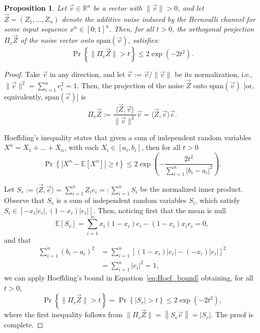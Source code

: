 \documentclass[10pt, conference]{IEEEtran}
\newtheorem{proposition}[theorem]{Proposition}
\newcommand{\1}{\mathds{1}}
\newcommand{\EE}{\mathbb{E}}
\newcommand{\RR}{\mathbb{R}}
\begin{document}
\begin{proposition}\label{proposition:projective_property}
Let $\vec{v}\in\RR^n$ be a vector with $\|\vec v\|>0$, and let $\vec{Z}=(Z_1,\dots,Z_n)$ denote the additive noise induced by the Bernoulli channel for some input sequence $x^n\in[0;1]^n$. Then, for all $t>0$, the orthogonal projection $\Pi_{v}\vec Z$ of the noise vector onto $\text{span}(\vec{v})$, satisfies:
\[
\Pr\left\{\|\Pi_{v}\vec Z\|>t\right\}\leq 2\exp \left(-2t^2\right).
\]
\end{proposition}
\begin{proof}
Take $\vec v$ in any direction, and let $\vec e:=\vec v/\|\vec v\|$ be its normalization, i.e., $\|\vec e\|^2=\sum_{i=1}^n e_i^2=1$. Then, the projection of the noise $\vec Z$ onto $\text{span}(\vec v)$ [or, equivalently, $\text{span}(\vec e)$] is
\begin{equation}\label{eq:orth_projection}
\Pi_{v}\vec Z:=\frac{\langle\vec Z,\vec v\rangle}{\|\vec v\|^2}\vec v=\langle\vec Z,\vec e\rangle\vec e.
\end{equation}

Hoeffding's inequality \cite{Hoeffding_inequality} states that given a sum of independent random variables $X^n=X_1+\dots+X_n$, with each $X_i\in[a_i,b_i]$, then for all $t>0$
\begin{equation}\label{eq:Hoef_bound}
\!\!\Pr\left\{|X^n-\EE[X^n]|\!\geq\! t\right\}\leq 2\exp\left(-\frac{2t^2}{\sum_{i=1}^n \left|b_i-a_i\right|^2}\right)\!.
\end{equation}

Let  
\(
S_v:=\langle\vec Z,\vec e\rangle=\sum_{i=1}^n Z_ie_i=:\sum_{i=1}^n S_i
\)
be the normalized inner product. Observe that $S_v$ is a sum of independent random variables $S_i$, which satisfy $S_i\in[-x_i|e_i|,(1-x_i)|e_i|]$. Then, noticing first that the mean is null
\begin{equation}
    \EE[S_v]=\sum_{i=1}^n x_i(1-x_i)e_i-(1-x_i)x_ie_i=0,
\end{equation}
and that 
\begin{equation}
\begin{split}
\sum_{i=1}^n(b_i-a_i)^2&=\sum_{i=1}^n \left[(1-x_i)|e_i|-(-x_i)|e_i|\right]^2\\
&=\sum_{i=1}^n |e_i|^2=1,
\end{split}
\end{equation}
we can apply Hoeffding's bound in Equation~\eqref{eq:Hoef_bound} obtaining, for all $t>0$,
\begin{equation}
\Pr\left\{\|\Pi_{v}\vec Z\|>t\right\}=\Pr\left\{|S_v|>t\right\}\leq 2\exp \left(-2t^2\right),
\end{equation}
where the first inequality follows from $\|\Pi_{ v}\vec Z\|\!=\!\left\|S_v\vec e\right\|\!=\!|S_v|$. The proof is complete.
\end{proof}
\end{document}
